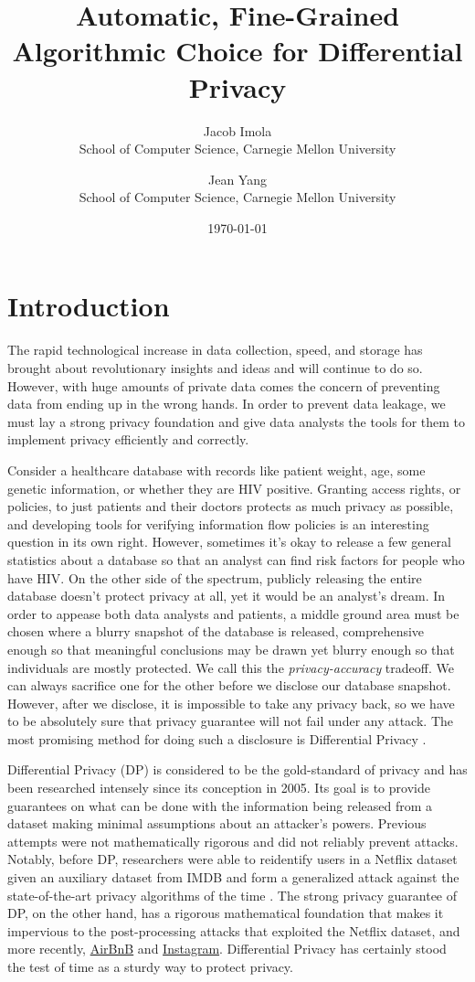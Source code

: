 \documentclass[11pt]{article}
\title{Automatic, Fine-Grained Algorithmic Choice for Differential Privacy}
\date{\today}
\author{Jacob Imola\\ School of Computer Science, Carnegie Mellon University\and Jean Yang\\ School of Computer Science, Carnegie Mellon University}
\begin{document}
\maketitle
\section{Introduction}
The rapid technological increase in data collection, speed, and storage has brought about revolutionary insights and ideas and will continue to do so. However, with huge amounts of private data comes the concern of preventing data from ending up in the wrong hands. In order to prevent data leakage, we must lay a strong privacy foundation and give data analysts the tools for them to implement privacy efficiently and correctly.

Consider a healthcare database with records like patient weight, age, some genetic information, or whether they are HIV positive. Granting access rights, or policies, to just patients and their doctors protects as much privacy as possible, and developing tools for verifying information flow policies is an interesting question in its own right. However, sometimes it's okay to release a few general statistics about a database so that an analyst can find risk factors for people who have HIV. On the other side of the spectrum, publicly releasing the entire database doesn't protect privacy at all, yet it would be an analyst's dream. In order to appease both data analysts and patients, a middle ground area must be chosen where a blurry snapshot of the database is released, comprehensive enough so that meaningful conclusions may be drawn yet blurry enough so that individuals are mostly protected. We call this the \emph{privacy-accuracy} tradeoff. We can always sacrifice one for the other before we disclose our database snapshot. However, after we disclose, it is impossible to take any privacy back, so we have to be absolutely sure that privacy guarantee will not fail under any attack. The most promising method for doing such a disclosure is Differential Privacy \cite{Dwork:2006}.

Differential Privacy (DP) is considered to be the gold-standard of privacy and has been researched intensely since its conception in 2005. Its goal is to provide guarantees on what can be done with the information being released from a dataset making minimal assumptions about an attacker's powers. Previous attempts were not mathematically rigorous and did not reliably prevent attacks. Notably, before DP, researchers were able to reidentify users in a Netflix dataset given an auxiliary dataset from IMDB and form a generalized attack against the state-of-the-art privacy algorithms of the time \cite{Narayanan:2006}. The strong privacy guarantee of DP, on the other hand, has a rigorous mathematical foundation that makes it impervious to the post-processing attacks that exploited the Netflix dataset, and more recently, \href{https://hackernoon.com/how-to-rob-an-airbnb-252e7e7eda44}{AirBnB} and \href{https://gizmodo.com/this-is-almost-certainly-james-comey-s-twitter-account-1793843641}{Instagram}. Differential Privacy has certainly stood the test of time as a sturdy way to protect privacy.
\end{document}
